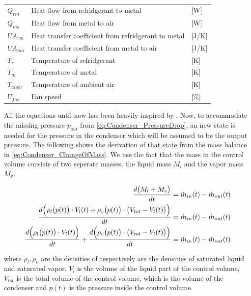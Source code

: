 \begin{center}
	\begin{tabular}{l p{8cm} l}
		$Q_{rm}$				&	Heat flow from refridgerant to metal					& [\si{W}] \\
		$Q_{ma}$				&	Heat flow from metal to air								& [\si{W}] \\
		$U A_{rm}$				& 	Heat transfer coefficient from refridgerant to metal 	& [\si{J}/\si{K}] \\
		$U A_{ma}$				& 	Heat transfer coefficient from metal to air				& [\si{J}/\si{K}] \\
		$T_r$					& 	Temperature of refridgerant 							& [\si{K}] \\
		$T_m$					&	Temperature of metal 									& [\si{K}] \\
		$T_{ambi}$				&	Temperature of ambient air 								& [\si{K}] \\
		$U_{fan}$				&	Fan speed												& [$\%$] \\
	\end{tabular}
\end{center}

All the equations until now has been heavily inspired by \cite{Sorensen2013}.
Now, to accommodate the missing pressure $ p_{out} $ from \cref{eq:Condenser_PressureDrop}, an new state is needed for the pressure in the condenser which will be assumed to be the output pressure. The following shows the derivation of that state from the mass balance in \cref{eq:Condenser_ChangeOfMass}. We use the fact that the mass in the control volume consists of two seperate masses, the liquid mass $ M_l $ and the vapor mass $ M_v $.


\begin{align}
		 		\frac{d \bigl(M_{l} + M_{v}\bigr) }{dt} & = \dot{m}_{in}(t) - \dot{m}_{out}(t) 		\label{eq:Condenser_pres1}\\
		 		\frac{d \Bigl(\rho_{l}\bigl(p(t)\bigr)\cdot V_l(t) + \rho_{v}\bigl(p(t)\bigr)\cdot \bigl(V_{tot} - V_l(t)\bigr)\Bigr) }{dt} & = \dot{m}_{in}(t) - \dot{m}_{out}(t)		\label{eq:Condenser_pres2}\\
		 		\frac{d \Bigl(\rho_{l}\bigl(p(t)\bigr)\cdot V_l(t)\Bigr)}{dt} + \frac{d \Bigl(\rho_{v}\bigl(p(t)\bigr)\cdot \bigl(V_{tot} - V_l(t)\bigr)\Bigr) }{dt} & = \dot{m}_{in}(t) - \dot{m}_{out}(t)		\label{eq:Condenser_pres3}
\end{align}

where $\rho_{l}, \rho_{v}$ are the densities of respectively are the densities of saturated liquid and saturated vapor. $ V_l$ is the volume of the liquid part of the control volume, $V_{tot} $ is the total volume of the control volume, which is the volume of the condenser and $p(t)$ is the pressure inside the control volume. 

